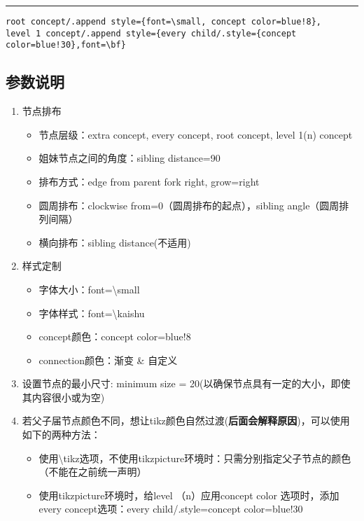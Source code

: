 \documentclass[12pt]{article}
\begin{document}
\noindent\rule{.95\linewidth}{2pt}
\begin{verbatim}
root concept/.append style={font=\small, concept color=blue!8},
level 1 concept/.append style={every child/.style={concept color=blue!30},font=\bf}
\end{verbatim}

\subsection{参数说明}

\begin{enumerate}[(1)]
    \item 节点排布
        \begin{itemize}
            \item 节点层级：extra concept, every concept, root concept, level 1(n) concept
            \item 姐妹节点之间的角度：sibling distance=90
            \item 排布方式：edge from parent fork right, grow=right
            \item 圆周排布：clockwise from=0（圆周排布的起点），sibling angle（圆周排列间隔） 
            \item 横向排布：sibling distance\;(不适用)
        \end{itemize}    
    \item 样式定制
        \begin{itemize}
            \item 字体大小：font=\textbackslash small
            \item 字体样式：font=\textbackslash kaishu
            \item concept颜色：concept color=blue!8
            \item connection颜色：渐变 \& 自定义
        \end{itemize} 
    \item 设置节点的最小尺寸: minimum size = 20(以确保节点具有一定的大小，即使其内容很小或为空)
    \item 若父子届节点颜色不同，想让tikz颜色自然过渡({\bf 后面会解释原因})，可以使用如下的两种方法：
        \begin{itemize}
            \item 使用\textbackslash tikz选项，不使用tikzpicture环境时：只需分别指定父子节点的颜色（不能在之前统一声明）
            \item 使用tikzpicture环境时，给level （n）应用concept color 选项时，添加every concept选项：every child/.style={concept color=blue!30}
        \end{itemize}
\end{enumerate}
\end{document}
